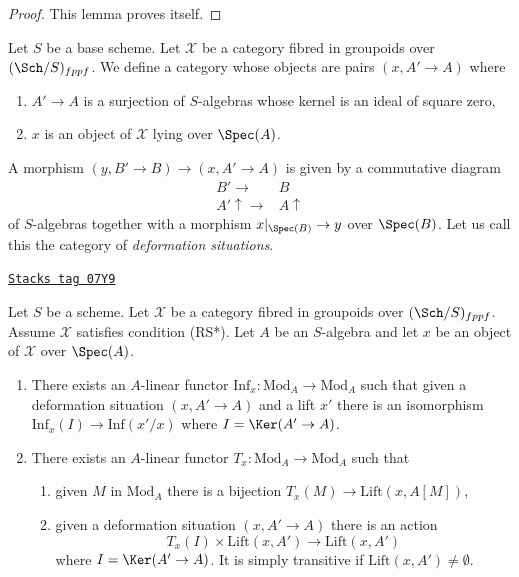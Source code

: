 \begin{proof}
This lemma proves itself.
\end{proof}

Let $S$ be a base scheme. Let $\mathcal{X}$ be a category fibred
in groupoids over $(\Sch/S)_{fppf}$. We define a category whose objects are
pairs $(x, A' \to A)$ where
\begin{enumerate}
\item $A' \to A$ is a surjection of $S$-algebras whose kernel
is an ideal of square zero,
\item $x$ is an object of $\mathcal{X}$ lying over $\Spec(A)$.
\end{enumerate}
A morphism $(y, B' \to B) \to (x, A' \to A)$ is given by a commutative
diagram
$$
\begin{array}{cc}B' \longrightarrow & B \\ A' \uparrow\longrightarrow & A \uparrow\end{array}
$$
of $S$-algebras together with a morphism $x|_{\Spec(B)} \to y$ over
$\Spec(B)$. Let us call this the category of {\it deformation situations}.

\begin{lemma}
\label{artin-lemma-properties-lift-RS-star}
\href{https://stacks.math.columbia.edu/tag/07Y9}{\texttt{Stacks tag 07Y9}}

Let $S$ be a scheme. Let $\mathcal{X}$ be a category
fibred in groupoids over $(\Sch/S)_{fppf}$. Assume $\mathcal{X}$ satisfies
condition (RS*). Let $A$ be an $S$-algebra and let $x$ be an object of
$\mathcal{X}$ over $\Spec(A)$.
\begin{enumerate}
\item There exists an $A$-linear functor
$\text{Inf}_x : \text{Mod}_A \to \text{Mod}_A$
such that given a deformation situation $(x, A' \to A)$ and a lift $x'$
there is an isomorphism $\text{Inf}_x(I) \to \text{Inf}(x'/x)$ where
$I = \Ker(A' \to A)$.
\item There exists an $A$-linear functor
$T_x : \text{Mod}_A \to \text{Mod}_A$
such that
\begin{enumerate}
\item given $M$ in $\text{Mod}_A$ there is a bijection
$T_x(M) \to \text{Lift}(x, A[M])$,
\item given a deformation situation $(x, A' \to A)$ there is an action
$$
T_x(I) \times \text{Lift}(x, A') \to \text{Lift}(x, A')
$$
where $I = \Ker(A' \to A)$. It is simply transitive if
$\text{Lift}(x, A') \not = \emptyset$.
\end{enumerate}
\end{enumerate}
\end{lemma}

